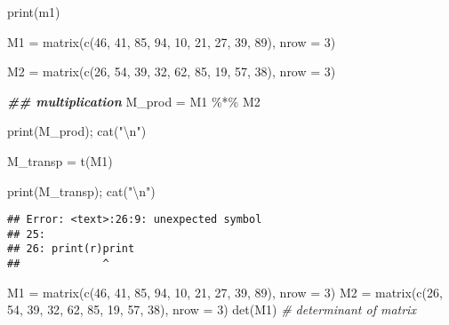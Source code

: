 \documentclass[
]{article}
\newenvironment{Shaded}{\begin{snugshade}}{\end{snugshade}}
\newcommand{\AttributeTok}[1]{\textcolor[rgb]{0.77,0.63,0.00}{#1}}
\newcommand{\CommentTok}[1]{\textcolor[rgb]{0.56,0.35,0.01}{\textit{#1}}}
\newcommand{\DecValTok}[1]{\textcolor[rgb]{0.00,0.00,0.81}{#1}}
\newcommand{\DocumentationTok}[1]{\textcolor[rgb]{0.56,0.35,0.01}{\textbf{\textit{#1}}}}
\newcommand{\FunctionTok}[1]{\textcolor[rgb]{0.00,0.00,0.00}{#1}}
\newcommand{\NormalTok}[1]{#1}
\newcommand{\OtherTok}[1]{\textcolor[rgb]{0.56,0.35,0.01}{#1}}
\newcommand{\SpecialCharTok}[1]{\textcolor[rgb]{0.00,0.00,0.00}{#1}}
\newcommand{\StringTok}[1]{\textcolor[rgb]{0.31,0.60,0.02}{#1}}
\begin{document}
\begin{Shaded}
\begin{Highlighting}[]
\FunctionTok{print}\NormalTok{(m1)}

\NormalTok{M1 }\OtherTok{=} \FunctionTok{matrix}\NormalTok{(}\FunctionTok{c}\NormalTok{(}\DecValTok{46}\NormalTok{,  }\DecValTok{41}\NormalTok{,  }\DecValTok{85}\NormalTok{,  }\DecValTok{94}\NormalTok{,  }\DecValTok{10}\NormalTok{,  }\DecValTok{21}\NormalTok{,  }\DecValTok{27}\NormalTok{,  }\DecValTok{39}\NormalTok{,  }\DecValTok{89}\NormalTok{), }\AttributeTok{nrow =} \DecValTok{3}\NormalTok{)}

\NormalTok{M2 }\OtherTok{=} \FunctionTok{matrix}\NormalTok{(}\FunctionTok{c}\NormalTok{(}\DecValTok{26}\NormalTok{,  }\DecValTok{54}\NormalTok{,  }\DecValTok{39}\NormalTok{,  }\DecValTok{32}\NormalTok{,  }\DecValTok{62}\NormalTok{,  }\DecValTok{85}\NormalTok{,  }\DecValTok{19}\NormalTok{,  }\DecValTok{57}\NormalTok{,  }\DecValTok{38}\NormalTok{), }\AttributeTok{nrow =} \DecValTok{3}\NormalTok{)}

\DocumentationTok{\#\# multiplication}
\NormalTok{M\_prod }\OtherTok{=}\NormalTok{ M1 }\SpecialCharTok{\%*\%}\NormalTok{ M2}

\FunctionTok{print}\NormalTok{(M\_prod); }\FunctionTok{cat}\NormalTok{(}\StringTok{"}\SpecialCharTok{\textbackslash{}n}\StringTok{"}\NormalTok{)}

\NormalTok{M\_transp }\OtherTok{=} \FunctionTok{t}\NormalTok{(M1)}

\FunctionTok{print}\NormalTok{(M\_transp); }\FunctionTok{cat}\NormalTok{(}\StringTok{"}\SpecialCharTok{\textbackslash{}n}\StringTok{"}\NormalTok{)}
\end{Highlighting}
\end{Shaded}

\begin{verbatim}
## Error: <text>:26:9: unexpected symbol
## 25: 
## 26: print(r)print
##             ^
\end{verbatim}

\begin{Shaded}
\begin{Highlighting}[]
\NormalTok{M1 }\OtherTok{=} \FunctionTok{matrix}\NormalTok{(}\FunctionTok{c}\NormalTok{(}\DecValTok{46}\NormalTok{,  }\DecValTok{41}\NormalTok{,  }\DecValTok{85}\NormalTok{,  }\DecValTok{94}\NormalTok{,  }\DecValTok{10}\NormalTok{,  }\DecValTok{21}\NormalTok{,  }\DecValTok{27}\NormalTok{,  }\DecValTok{39}\NormalTok{,  }\DecValTok{89}\NormalTok{), }\AttributeTok{nrow =} \DecValTok{3}\NormalTok{)}
\NormalTok{M2 }\OtherTok{=} \FunctionTok{matrix}\NormalTok{(}\FunctionTok{c}\NormalTok{(}\DecValTok{26}\NormalTok{,  }\DecValTok{54}\NormalTok{,  }\DecValTok{39}\NormalTok{,  }\DecValTok{32}\NormalTok{,  }\DecValTok{62}\NormalTok{,  }\DecValTok{85}\NormalTok{,  }\DecValTok{19}\NormalTok{,  }\DecValTok{57}\NormalTok{,  }\DecValTok{38}\NormalTok{), }\AttributeTok{nrow =} \DecValTok{3}\NormalTok{)}
\FunctionTok{det}\NormalTok{(M1) }\CommentTok{\# determinant of matrix}
\end{Highlighting}
\end{Shaded}
\end{document}
